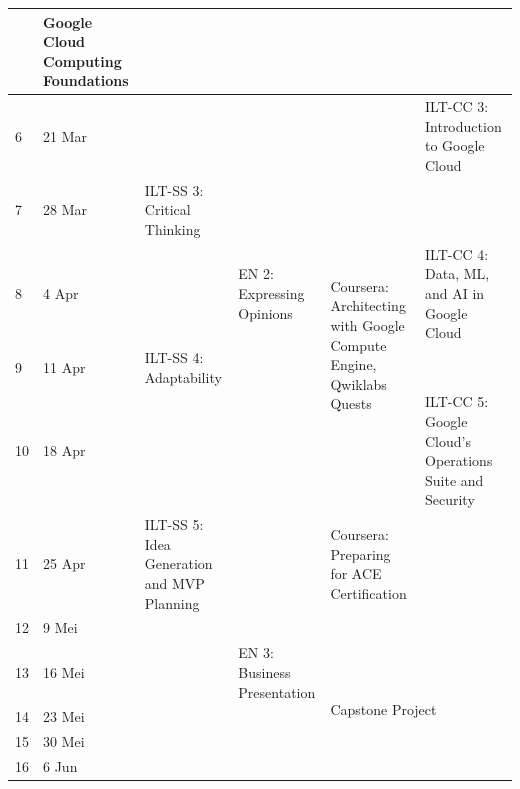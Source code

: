 \begin{longtable}{|p{2cm}p{2cm}|p{2cm}p{2cm}p{2cm}p{2cm}|}
	\multicolumn{1}{p{2cm}|}{} &
	\multicolumn{1}{p{2cm}|}{Google Cloud Computing Foundations} &
	\\ \hline
	\multicolumn{1}{|p{1cm}|}{6} &
	21 Mar &
	\multicolumn{1}{p{2cm}|}{} &
	\multicolumn{1}{p{2cm}|}{} &
	\multicolumn{1}{p{2cm}|}{} &
	ILT-CC 3: Introduction to Google Cloud \\ \hline
	\multicolumn{1}{|p{1cm}|}{7} &
	28 Mar &
	\multicolumn{1}{p{2cm}|}{ILT-SS 3: Critical Thinking} &
	\multicolumn{1}{p{2cm}|}{} &
	\multicolumn{1}{p{2cm}|}{\multirow{4}{2cm}{Coursera: Architecting with Google Compute Engine, Qwiklabs Quests}} &
	\\ \cline{1-4} \cline{6-6} 
	\multicolumn{1}{|p{1cm}|}{8} &
	4 Apr &
	\multicolumn{1}{p{2cm}|}{} &
	\multicolumn{1}{p{2cm}|}{EN 2: Expressing Opinions} &
	\multicolumn{1}{p{2cm}|}{} &
	ILT-CC 4: Data, ML, and AI in Google Cloud \\ \cline{1-4} \cline{6-6} 
	\multicolumn{1}{|p{1cm}|}{9} &
	11 Apr &
	\multicolumn{1}{p{2cm}|}{ILT-SS 4: Adaptability} &
	\multicolumn{1}{p{2cm}|}{} &
	\multicolumn{1}{p{2cm}|}{} &
	\\ \cline{1-4} \cline{6-6} 
	\multicolumn{1}{|p{1cm}|}{10} &
	18 Apr &
	\multicolumn{1}{p{2cm}|}{} &
	\multicolumn{1}{p{2cm}|}{} &
	\multicolumn{1}{p{2cm}|}{} &
	ILT-CC 5: Google Cloud's Operations Suite and Security \\ \hline
	\multicolumn{1}{|p{1cm}|}{11} &
	25 Apr &
	\multicolumn{1}{p{2cm}|}{ILT-SS 5: Idea Generation and MVP Planning} &
	\multicolumn{1}{p{2cm}|}{} &
	\multicolumn{1}{p{2cm}|}{Coursera: Preparing for ACE Certification} &
	\\ \hline
	\multicolumn{1}{|p{1cm}|}{12} &
	9 Mei &
	\multicolumn{1}{p{2cm}|}{} &
	\multicolumn{1}{p{2cm}|}{} &
	\multicolumn{1}{p{2cm}|}{} &
	\\ \hline
	\multicolumn{1}{|p{1cm}|}{13} &
	16 Mei &
	\multicolumn{1}{p{2cm}|}{} &
	\multicolumn{1}{p{2cm}|}{EN 3: Business Presentation} &
	\multicolumn{2}{p{2cm}|}{\multirow{5}{2cm}{Capstone Project}} \\ \cline{1-4}
	\multicolumn{1}{|p{1cm}|}{14} &
	23 Mei &
	\multicolumn{1}{p{2cm}|}{} &
	\multicolumn{1}{p{2cm}|}{} &
	\multicolumn{2}{p{2cm}|}{} \\ \cline{1-4}
	\multicolumn{1}{|p{1cm}|}{15} &
	30 Mei &
	\multicolumn{1}{p{2cm}|}{} &
	\multicolumn{1}{p{2cm}|}{} &
	\multicolumn{2}{p{2cm}|}{} \\ \cline{1-4}
	\multicolumn{1}{|p{1cm}|}{16} &
	6 Jun &
	\multicolumn{1}{p{2cm}|}{} &
	\multicolumn{1}{p{2cm}|}{} &
	\multicolumn{2}{p{2cm}|}{} \\ \cline{1-4}

\end{longtable}

